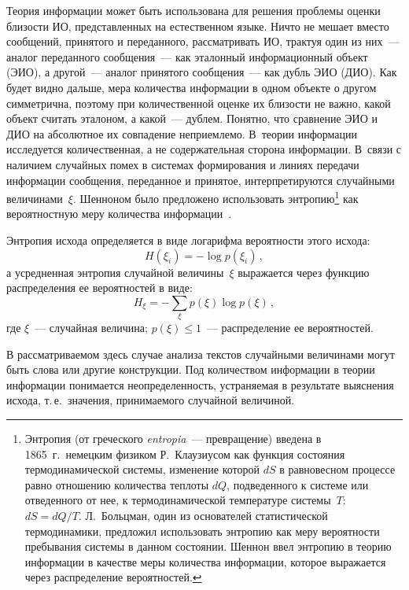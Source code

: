 \begin{multicols}{2}
   Теория информации может быть использована для решения проблемы 
оценки близости ИО, представленных на естественном языке. Ничто не 
мешает вместо сообщений, принятого и переданного, рассматривать 
ИО, трактуя один из них~--- аналог переданного 
сообщения~--- как эталонный информационный объект (ЭИО), а другой~--- 
аналог принятого сообщения~--- как дубль ЭИО (ДИО). 
Как будет видно дальше, мера количества информации в 
одном объекте о другом симметрична, поэтому при количественной оценке 
их близости не важно, какой объект считать эталоном, а какой~--- дублем. 
Понятно, что сравнение ЭИО и ДИО на абсолютное их совпадение 
неприемлемо. В~теории информации исследуется количественная, а не 
содержательная сторона информации. В~связи с наличием случайных помех 
в системах формирования и линиях передачи информации сообщения, 
переданное и принятое, интерпретируются случайными величинами~$\xi$. 
Шенноном было предложено использовать энтропию\footnote{Энтропия (от 
греческого \textit{entropia}~--- превращение) введена в 1865~г.\ немецким физиком Р.~Клаузиусом как 
функция состояния термодинамической системы, изменение которой $dS$ в равновесном процессе равно 
отношению количества теплоты $dQ$, подведенного к системе или отведенного от нее, к 
термодинамической температуре системы~$T$: $dS=dQ/T$. Л.~Больцман, один из основателей 
статистической термодинамики, предложил использовать энтропию как меру вероятности пребывания 
системы в данном состоянии. Шеннон ввел энтропию в теорию информации в качестве меры количества 
информации, которое выражается через распределение вероятностей.} как вероятностную меру 
количества информации~\cite{3-k}.
   
   Энтропия исхода определяется в виде логарифма вероятности этого 
исхода:
   \begin{equation}
   H(\xi_i)=- \log p(\xi_i)\,,
   \label{e1-k}
   \end{equation}
а усредненная энтропия случайной величины~$\xi$ выражается через 
функцию распределения ее вероятностей в виде:
\begin{equation}
H_\xi =- \sum\limits_\xi p(\xi)\log p(\xi)\,,
\label{e2-k}
\end{equation}
где $\xi$~--- случайная величина; $p(\xi)\leq 1$~--- распределение ее 
вероятностей. 
   
   В рассматриваемом здесь случае анализа текстов случайными 
величинами могут быть слова или другие конструкции. Под количеством 
информации в теории информации понимается неопределенность, 
устраняемая в результате выяснения исхода, т.\,е.\ значения, принимаемого 
случайной величиной. 
   

\end{multicols}
